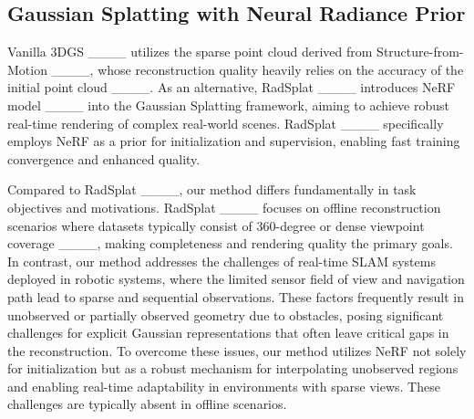 \subsection{Gaussian Splatting with Neural Radiance Prior}

Vanilla 3DGS ____ utilizes the sparse point cloud derived from Structure-from-Motion ____, whose reconstruction quality heavily relies on the accuracy of the initial point cloud ____. As an alternative, RadSplat ____ introduces NeRF model ____ into the Gaussian Splatting framework, aiming to achieve robust real-time rendering of complex real-world scenes. RadSplat ____ specifically employs NeRF as a prior for initialization and supervision, enabling fast training convergence and enhanced quality.

Compared to RadSplat ____, our method differs fundamentally in task objectives and motivations. RadSplat ____ focuses on offline reconstruction scenarios where datasets typically consist of 360-degree or dense viewpoint coverage ____, making completeness and rendering quality the primary goals. In contrast, our method addresses the challenges of real-time SLAM systems deployed in robotic systems, where the limited sensor field of view and navigation path lead to sparse and sequential observations. These factors frequently result in unobserved or partially observed geometry due to obstacles, posing significant challenges for explicit Gaussian representations that often leave critical gaps in the reconstruction. To overcome these issues, our method utilizes NeRF not solely for initialization but as a robust mechanism for interpolating unobserved regions and enabling real-time adaptability in environments with sparse views. These challenges are typically absent in offline scenarios.